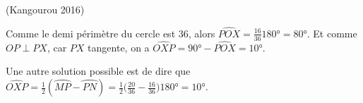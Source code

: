 \documentclass[a4paper,12pt,reqno]{amsart}
\begin{document}
\sisujet{\bigskip}
\sisolutions{\newpage}

\begin{exo} (Kangourou 2016)

\end{exo}

\begin{solution}

  Comme le demi périmètre du cercle est $36$, alors $\widehat{POX}=\frac{16}{36}180°=80°$. Et comme $OP\perp PX$, car $PX$ tangente, on a $\widehat{OXP}=90°-\widehat{POX}=10°$.

  Une autre solution possible est de dire que $\widehat{OXP}=\frac12(\wideparen{MP} - \wideparen{PN})= \frac12\big(\frac{20}{36}-\frac{16}{36}\big)180°= 10°$.
\end{solution}
\end{document}
